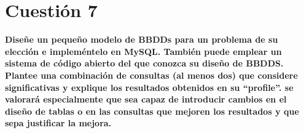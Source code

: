 \documentclass[a4paper,11pt]{article}
\newenvironment{answer}{%
\begin{list}{}{%
}%
\item[]}{\end{list}}
\begin{document}
\section{Cuestión 7}
\textbf{Diseñe un pequeño modelo de BBDDs para un problema de su elección e impleméntelo en MySQL. También puede emplear un sistema
de código abierto del que conozca su diseño de BBDDS. Plantee una combinación de consultas (al menos dos) que considere significativas
y explique los resultados obtenidos en su ``profile''. se valorará especialmente que sea capaz de introducir cambios en el 
diseño de tablas o en las consultas que mejoren los resultados y que sepa justificar la mejora.}
\begin{answer}
 
\end{answer}

\newpage
\printbibliography
\end{document}
